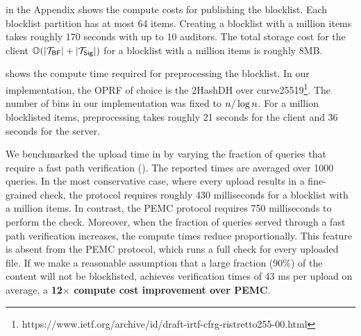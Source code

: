 

%
%



%
 in the Appendix shows the compute costs for publishing the blocklist. Each blocklist partition has at most 64 items. Creating a blocklist with a million items takes roughly 170 seconds with up to 10 auditors. The total storage cost for the client $\bigO(\setSize{\bfBlklistToken} + \setSize{\sigBlklistToken})$ for a blocklist with a million items is roughly 8MB. 


%
 shows the compute time required for preprocessing the blocklist. In our implementation, the OPRF of choice is the 2HashDH over curve25519\footnote{https://www.ietf.org/archive/id/draft-irtf-cfrg-ristretto255-00.html}. The number of bins in our implementation was fixed to $n/\log n$. For a million blocklisted items, preprocessing takes roughly 21 seconds for the client and 36 seconds for the server. 

%
We benchmarked the upload time in \protocolEM by varying the fraction of queries that require a fast path verification (). The reported times are averaged over 1000 queries. In the most conservative case, where every upload results in a fine-grained check, the protocol requires roughly 430 milliseconds for a blocklist with a million items. In contrast, the PEMC protocol requires 750 milliseconds to perform the check. Moreover, when the fraction of queries served through a fast path verification increases, the compute times reduce proportionally. This feature is absent from the PEMC protocol, which runs a full check for every uploaded file. If we make a reasonable assumption that a large fraction (90\%) of the content will not be blocklisted, \protocolEM achieves verification times of 43 ms per upload on average, a \textbf{12$\times$ compute cost improvement over PEMC}. 

